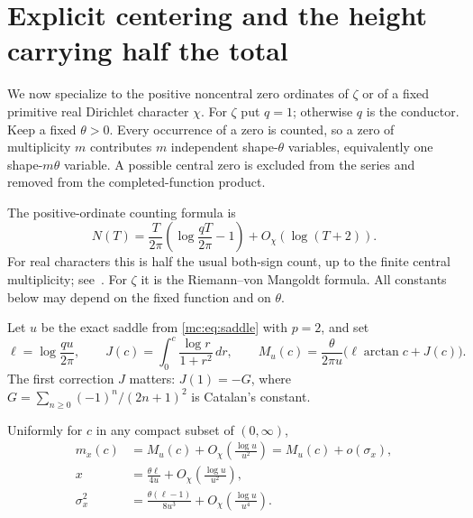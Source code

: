 \section{Explicit centering and the height carrying half the total}
\label{sec:median}

We now specialize to the positive noncentral zero ordinates of $\zeta$
or of a fixed primitive real Dirichlet character $\chi$. For $\zeta$ put
$q=1$; otherwise $q$ is the conductor. Keep a fixed $\theta>0$.
Every occurrence of a zero is counted, so a zero of multiplicity $m$
contributes $m$ independent shape-$\theta$ variables, equivalently one
shape-$m\theta$ variable. A possible central zero is excluded from the
series and removed from the completed-function product.

The positive-ordinate counting formula is
\begin{equation}\label{med:eq:count}
 N(T)=\frac{T}{2\pi}\left(\log\frac{qT}{2\pi}-1\right)
       +O_\chi(\log(T+2)).
\end{equation}
For real characters this is half the usual both-sign count, up to the
finite central multiplicity; see~\cite{BennettEtAl}. For $\zeta$ it is
the Riemann--von Mangoldt formula. All constants below may depend on the
fixed function and on $\theta$.

Let $u$ be the exact saddle from \eqref{mc:eq:saddle} with $p=2$, and set
\[
 \ell=\log\frac{qu}{2\pi},\qquad
 J(c)=\int_0^c\frac{\log r}{1+r^2}\,dr,\qquad
 M_u(c)=\frac{\theta}{2\pi u}
                 \bigl(\ell\arctan c+J(c)\bigr).
\]
The first correction $J$ matters: $J(1)=-G$, where
$G=\sum_{n\ge0}(-1)^n/(2n+1)^2$ is Catalan's constant.

\begin{lemma}
\label{med:lem:center}
Uniformly for $c$ in any compact subset of $(0,\infty)$,
\begin{align}
 m_x(c)&=M_u(c)+O_\chi\left(\frac{\log u}{u^2}\right)
                  =M_u(c)+o(\sigma_x),\label{med:eq:mean}\\
 x&=\frac{\theta\ell}{4u}
                  +O_\chi\left(\frac{\log u}{u^2}\right),\label{med:eq:total}\\
 \sigma_x^2&=\frac{\theta(\ell-1)}{8u^3}
                  +O_\chi\left(\frac{\log u}{u^4}\right).
                  \label{med:eq:variance}
\end{align}
\end{lemma}

